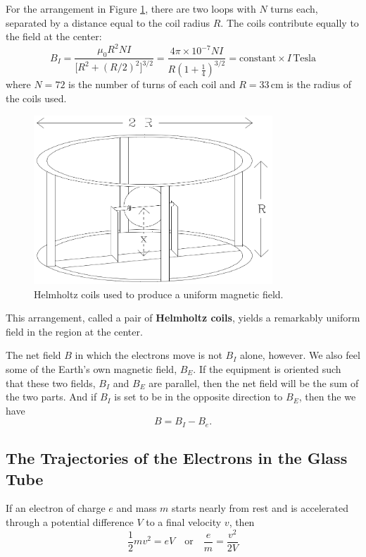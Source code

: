 For the arrangement in Figure {\ref{fig:coils}}, there are two loops with $N$ turns each, separated by a distance equal to the coil radius $R$. The coils contribute equally to the field at the center:
\begin{equation}
  B_{I}=\frac{\mu_{0}R^2NI}{\big[R^2+(R/2)^2\big]^{3/2}}=\frac{4\pi\times 10^{-7}NI}{R(1+\frac{1}{4})^{3/2}}=\mathrm{constant}\times I\, \mathrm{Tesla}
\end{equation}
where $N = 72$ is the number of turns of each coil and $R = 33\, \mathrm{cm}$ is the radius of the coils used.\myskip
\begin{figure}[h]
\centering
\includegraphics[width=0.8\textwidth]{./Exp6/pic/image2.png}
\caption{Helmholtz coils used to produce a uniform magnetic field.}
\label{fig:coils}
\end{figure}

This arrangement, called a pair of \textbf{Helmholtz coils}, yields a remarkably uniform field in the region at the center.\myskip

The net field $B$ in which the electrons move is not $B_I$ alone, however. We also feel some of the Earth's own magnetic field, $B_E$. If the equipment is oriented such that these two fields, $B_I$ and $B_E$ are parallel, then the net field will be the sum of the two parts. And if $B_I$ is set to be in the opposite direction to $B_E$, then the we have
\begin{equation}
  B=B_{I}-B_{e}.
\label{eq:b}
\end{equation}

\subsection{The Trajectories of the Electrons in the Glass Tube}
If an electron of charge $e$ and mass $m$ starts nearly from rest and is accelerated through a potential difference $V$ to a final velocity $v$, then
\begin{equation}
  \frac{1}{2}mv^2=eV\quad \mathrm{or}\quad \frac{e}{m}=\frac{v^2}{2V}
\label{eq:ev}
\end{equation}

